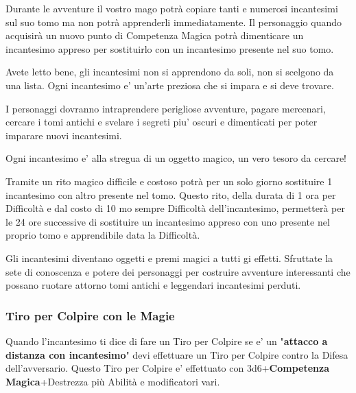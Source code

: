 \begin{multicols}{2}
Durante le avventure il vostro mago potrà copiare tanti e numerosi incantesimi sul suo tomo ma non potrà apprenderli immediatamente. Il personaggio quando acquisirà un nuovo punto di Competenza Magica potrà dimenticare un incantesimo appreso per sostituirlo con un incantesimo presente nel suo tomo.

\medskip

\begin{tcolorbox}[enhanced,arc=5pt,boxrule=0.3pt,width=0.45\textwidth,title = Scegliere gli Incantesimi]
Avete letto bene, gli incantesimi non si apprendono da soli, non si scelgono da una lista. Ogni incantesimo e' un'arte preziosa che si impara e si deve trovare.	
	
I personaggi dovranno intraprendere perigliose avventure, pagare mercenari, cercare i tomi antichi e svelare i segreti piu' oscuri e dimenticati per poter imparare nuovi incantesimi.
	
Ogni incantesimo e' alla stregua di un oggetto magico, un vero tesoro da cercare!
\end{tcolorbox}

\medskip

Tramite un rito magico difficile e costoso potrà per un solo giorno sostituire 1 incantesimo con altro presente nel tomo. Questo rito, della durata di 1 ora per Difficoltà e dal costo di 10 mo sempre Difficoltà dell'incantesimo, permetterà per le 24 ore successive di sostituire un incantesimo appreso con uno presente nel proprio tomo e apprendibile data la Difficoltà.

\medskip

\begin{narratore}
	Gli incantesimi diventano oggetti e premi magici a tutti gi effetti. Sfruttate la sete di conoscenza e potere dei personaggi per costruire avventure interessanti che possano ruotare attorno tomi antichi e leggendari incantesimi perduti.
\end{narratore}

\subsubsection{Tiro per Colpire con le Magie}

Quando l'incantesimo ti dice di fare un Tiro per Colpire se e' un "\textbf{attacco a distanza con incantesimo}" devi effettuare un Tiro per Colpire contro la Difesa dell'avversario. Questo Tiro per Colpire e' effettuato con 3d6+\textbf{Competenza Magica}+Destrezza più Abilità e modificatori vari.\\


\end{multicols}
